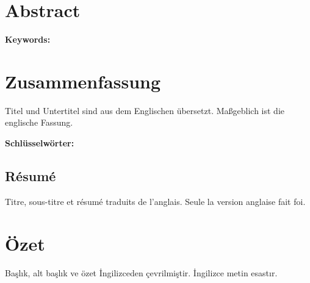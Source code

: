 \documentclass[12pt,ngerman,english,openany]{book}
\makeatletter
\newcommand{\projKeywords}    {}
\newcommand{\projKeywordsDE}  {}
\newcommand{\translatedTitle}[2]{%
	{\setlength{\parindent}{0pt}\raggedright
	{\large\bfseries \par}
	\smallskip
	{\itshape \/\par}
	\medskip
	{\small #2\par}
	\bigskip}%
	\@afterindentfalse\@afterheading}
\makeatother
\begin{document}
\pagestyle{plain}

\clearpage

\pagestyle{plain}
\chapter*{Abstract}

{
	\setlength{\parskip}{1em}
	\setlength{\parindent}{0pt}
	\par\nopagebreak
	{\bfseries Keywords:} \projKeywords\par
}
\clearpage

\pagestyle{plain}
\chapter*{Zusammenfassung}
\translatedTitle{de}{Titel und Untertitel sind aus dem Englischen übersetzt. Maßgeblich ist die englische Fassung.}
{\setlength{\emergencystretch}{1.2em}\par}
{
	\setlength{\parskip}{1em}
	\setlength{\parindent}{0pt}
	\par
	{\bfseries Schlüsselwörter:} \projKeywordsDE
}
\clearpage

\begin{otherlanguage}{french}
\NoAutoSpacing
\pagestyle{plain}
\chapter*{Résumé}
\translatedTitle{fr}{Titre, sous-titre et résumé traduits de l’anglais. Seule la version anglaise fait foi.}

\clearpage
\end{otherlanguage}

\pagestyle{plain}
\chapter*{Özet}
\translatedTitle{tr}{Başlık, alt başlık ve özet İngilizceden çevrilmiştir. İngilizce metin esastır.}

\clearpage
\end{document}
